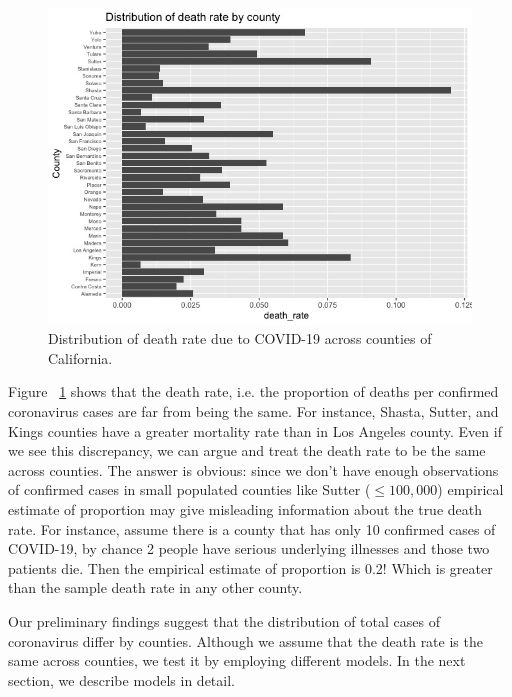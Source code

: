 \documentclass[11pt,twocolumn]{asaproc}
\begin{document}
\begin{figure}[t]
\centering\includegraphics[scale=.30]{death_rate.jpeg}
\caption{Distribution of death rate due to COVID-19 across counties of California.}
\label{fig:deathrate}
\end{figure}

Figure ~\ref{fig:deathrate} shows that the death rate, i.e. the proportion of deaths per confirmed coronavirus cases are far from being the same. For instance, Shasta, Sutter, and Kings counties have a greater mortality rate than in Los Angeles county. Even if we see this discrepancy, we can argue and treat the death rate to be the same across counties. The answer is obvious: since we don't have enough observations of confirmed cases in small populated counties like Sutter ($\leq 100,000$) empirical estimate of proportion may give misleading information about the true death rate. For instance, assume there is a county that has only 10 confirmed cases of COVID-19, by chance 2 people have serious underlying illnesses and those two patients die. Then the empirical estimate of proportion is 0.2! Which is greater than the sample death rate in any other county. 

Our preliminary findings suggest that the distribution of total cases of coronavirus differ by counties. Although we assume that the death rate is the same across counties, we test it by employing different models. In the next section, we describe models in detail.
\end{document}
